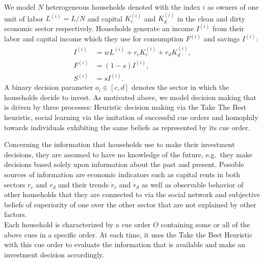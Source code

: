 We model $N$ heterogeneous households denoted with the index $i$ as owners of one unit of labor $L^{(i)} = L/N$ and capital $K_c^{(i)}$ and $K_d^{(i)}$ in the clean and dirty economic sector respectively.
Households generate an income $I^{(i)}$ from their labor and capital income which they use for consumption $F^{(i)}$ and savings $I^{(i)}$:
\begin{align}
	I^{(i)} &= w L^{(i)} + r_c K_c^{(i)} + r_d K_d^{(i)}, \label{eq:household_income} \\
	F^{(i)} &= (1-s) I^{(i)}, \label{eq:consumption} \\
	S^{(i)} &= s I^{(i)}. \label{eq:savings}
\end{align}
A binary decision parameter $o_i \in [c,d]$ denotes the sector in which the households decide to invest. As motivated above, we model decision making that is driven by three processes: Heuristic decision making via the Take The Best heuristic, social learning via the imitation of successful cue orders and homophily towards individuals exhibiting the same beliefs as represented by its cue order. \par

Concerning the information that households use to make their investment decisions, they are assumed to have no knowledge of the future, e.g.\ they make decisions based solely upon information about the past and present. Possible sources of information are economic indicators such as capital rents in both sectors $r_c$ and $r_d$ and their trends $\dot{r}_c$ and $\dot{r}_d$ as well as observable behavior of other households that they are connected to via the social network and subjective beliefs of superiority of one over the other sector that are not explained by other factors.\\
Each household is characterized by a cue order $O$ containing some or all of the above cues in a specific order. At each time, it uses the Take the Best Heuristic with this cue order to evaluate the information that is available and make an investment decision accordingly.
\par

